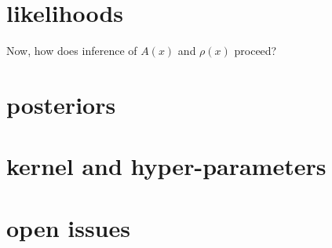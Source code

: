 \documentclass[12pt, letterpaper]{article}
\begin{document}
\section{likelihoods}

Now, how does inference of $A(x)$ and $\rho(x)$ proceed?

\section{posteriors}

\section{kernel and hyper-parameters}

\section{open issues}
\end{document}
